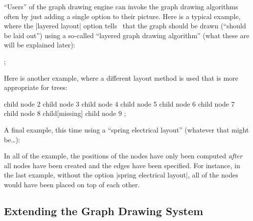 ``Users'' of the graph drawing engine can invoke the graph drawing algorithms
often by just adding a single option to their picture. Here is a typical
example, where the |layered layout| option tells \tikzname\ that the graph
should be drawn (``should be laid out'') using a so-called ``layered graph
drawing algorithm'' (what these are will be explained later):
%
\begin{codeexample}[]
\tikz [>=spaced stealth']
  ;
\end{codeexample}
%
Here is another example, where a different layout method is used that is more
appropriate for trees:
%
\begin{codeexample}[]
\tikz [grow'=up, binary tree layout, nodes={circle,draw}]
  child { node {2}
    child { node {3} }
    child { node {4}
      child { node {5} }
      child { node {6} }
    }
  }
  child { node {7}
    child { node {8}
      child[missing]
      child { node {9} }
    }
  };
\end{codeexample}
%
A final example, this time using a ``spring electrical layout'' (whatever that
might be\dots):
%
\begin{codeexample}[]
\end{codeexample}
%
In all of the example, the positions of the nodes have only been computed
\emph{after} all nodes have been created and the edges have been specified. For
instance, in the last example, without the option |spring electrical layout|,
all of the nodes would have been placed on top of each other.


\subsection{Extending the Graph Drawing System}

